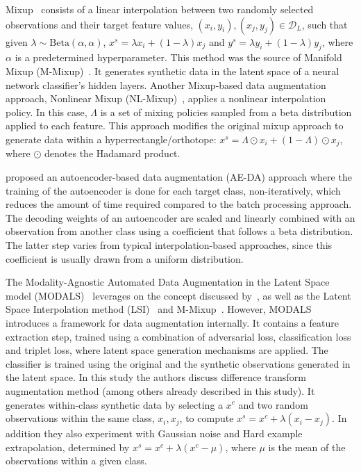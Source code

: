 Mixup~\cite{zhang2018mixup} consists of a linear interpolation between two
randomly selected observations and their target feature values, $(x_i, y_i),
(x_j, y_j) \in \mathcal{D}_L$, such that given $\lambda \sim
\text{Beta}(\alpha,\alpha)$, $x^s = \lambda x_i + (1-\lambda) x_j$ and $y^s =
\lambda y_i + (1-\lambda) y_j$, where $\alpha$ is a predetermined
hyperparameter. This method was the source of Manifold Mixup
(M-Mixup)~\cite{verma2019manifold}. It generates synthetic data in the latent
space of a neural network classifier's hidden layers. Another Mixup-based
data augmentation approach, Nonlinear Mixup
(NL-Mixup)~\cite{guo2020nonlinear}, applies a nonlinear interpolation policy.
In this case, $\Lambda$ is a set of mixing policies sampled from a beta
distribution applied to each feature. This approach modifies the original
mixup approach to generate data within a hyperrectangle/orthotope: $x^s =
\Lambda \odot x_i + (1-\Lambda) \odot x_j$, where $\odot$ denotes the Hadamard
product.

\citet{feng2020autuencoder} proposed an autoencoder-based data augmentation
(AE-DA) approach where the training of the autoencoder is done for each target
class, non-iteratively, which reduces the amount of time required compared to
the batch processing approach. The decoding weights of an autoencoder are
scaled and linearly combined with an observation from another class using a
coefficient that follows a beta distribution. The latter step varies from
typical interpolation-based approaches, since this coefficient is usually
drawn from a uniform distribution.

The Modality-Agnostic Automated Data Augmentation in the Latent Space model
(MODALS)~\cite{cheung2020modals} leverages on the concept discussed
by~\citet{devries2017dataset}, as well as the Latent Space Interpolation
method (LSI)~\cite{liu2018data} and M-Mixup~\cite{verma2019manifold}.
However, MODALS introduces a framework for data augmentation internally. It
contains a feature extraction step, trained using a combination of adversarial
loss, classification loss and triplet loss, where latent space generation
mechanisms are applied. The classifier is trained using the original and the
synthetic observations generated in the latent space. In this study the
authors discuss difference transform augmentation method (among others already
described in this study). It generates within-class synthetic data by
selecting a $x^c$ and two random observations within the same class, $x_i,
x_j$, to compute $x^s = x^c + \lambda (x_i-x_j)$. In addition they also
experiment with Gaussian noise and Hard example extrapolation, determined by
$x^s = x^c + \lambda (x^c-\mu)$, where $\mu$ is the mean of the observations
within a given class.

